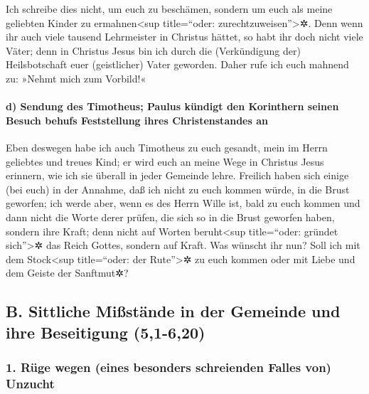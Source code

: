  Ich schreibe dies nicht, um euch zu beschämen, sondern
um euch als meine geliebten Kinder zu ermahnen\textless sup
title=``oder: zurechtzuweisen''\textgreater✲.  Denn wenn
ihr auch viele tausend Lehrmeister in Christus hättet, so habt ihr doch
nicht viele Väter; denn in Christus Jesus bin ich durch die
(Verkündigung der) Heilsbotschaft euer (geistlicher) Vater geworden.
 Daher rufe ich euch mahnend zu: »Nehmt mich zum
Vorbild!«

\hypertarget{d-sendung-des-timotheus-paulus-kuxfcndigt-den-korinthern-seinen-besuch-behufs-feststellung-ihres-christenstandes-an}{%
\paragraph{d) Sendung des Timotheus; Paulus kündigt den Korinthern
seinen Besuch behufs Feststellung ihres Christenstandes
an}\label{d-sendung-des-timotheus-paulus-kuxfcndigt-den-korinthern-seinen-besuch-behufs-feststellung-ihres-christenstandes-an}}

 Eben deswegen habe ich auch Timotheus zu euch gesandt,
mein im Herrn geliebtes und treues Kind; er wird euch an meine Wege in
Christus Jesus erinnern, wie ich sie überall in jeder Gemeinde lehre.
 Freilich haben sich einige (bei euch) in der Annahme,
daß ich nicht zu euch kommen würde, in die Brust geworfen;
 ich werde aber, wenn es des Herrn Wille ist, bald zu
euch kommen und dann nicht die Worte derer prüfen, die sich so in die
Brust geworfen haben, sondern ihre Kraft;  denn nicht auf
Worten beruht\textless sup title=``oder: gründet sich''\textgreater✲ das
Reich Gottes, sondern auf Kraft.  Was wünscht ihr nun?
Soll ich mit dem Stock\textless sup title=``oder: der
Rute''\textgreater✲ zu euch kommen oder mit Liebe und dem Geiste der
Sanftmut✲?

\hypertarget{b.-sittliche-miuxdfstuxe4nde-in-der-gemeinde-und-ihre-beseitigung-51-620}{%
\subsection{B. Sittliche Mißstände in der Gemeinde und ihre Beseitigung
(5,1-6,20)}\label{b.-sittliche-miuxdfstuxe4nde-in-der-gemeinde-und-ihre-beseitigung-51-620}}

\hypertarget{ruxfcge-wegen-eines-besonders-schreienden-falles-von-unzucht}{%
\subsubsection{1. Rüge wegen (eines besonders schreienden Falles von)
Unzucht}\label{ruxfcge-wegen-eines-besonders-schreienden-falles-von-unzucht}}

